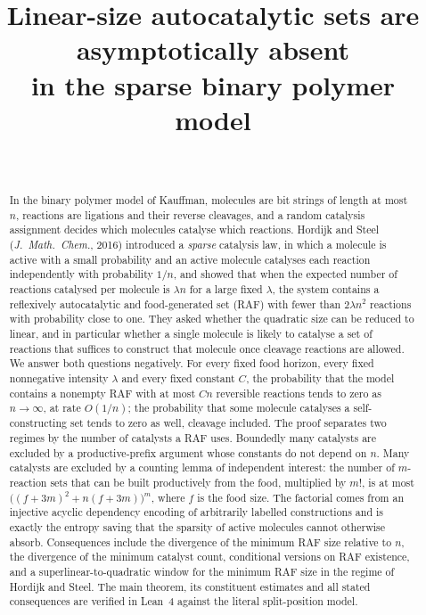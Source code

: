 \documentclass[11pt,a4paper]{article}
\title{Linear-size autocatalytic sets are asymptotically absent\\ in the sparse binary polymer model}
\author{\PaperAuthor\\ \PaperAffiliation}
\date{\PaperDate}
\theoremstyle{plain}
\theoremstyle{definition}
\theoremstyle{remark}
\begin{document}
\maketitle

\begin{abstract}
In the binary polymer model of Kauffman, molecules are bit strings of length at most $n$, reactions are ligations and their reverse cleavages, and a random catalysis assignment decides which molecules catalyse which reactions. Hordijk and Steel (\emph{J.\ Math.\ Chem.}, 2016) introduced a \emph{sparse} catalysis law, in which a molecule is active with a small probability and an active molecule catalyses each reaction independently with probability $1/n$, and showed that when the expected number of reactions catalysed per molecule is $\lambda n$ for a large fixed $\lambda$, the system contains a reflexively autocatalytic and food-generated set (RAF) with fewer than $2\lambda n^2$ reactions with probability close to one. They asked whether the quadratic size can be reduced to linear, and in particular whether a single molecule is likely to catalyse a set of reactions that suffices to construct that molecule once cleavage reactions are allowed. We answer both questions negatively. For every fixed food horizon, every fixed nonnegative intensity $\lambda$ and every fixed constant $C$, the probability that the model contains a nonempty RAF with at most $Cn$ reversible reactions tends to zero as $n\to\infty$, at rate $O(1/n)$; the probability that some molecule catalyses a self-constructing set tends to zero as well, cleavage included. The proof separates two regimes by the number of catalysts a RAF uses. Boundedly many catalysts are excluded by a productive-prefix argument whose constants do not depend on $n$. Many catalysts are excluded by a counting lemma of independent interest: the number of $m$-reaction sets that can be built productively from the food, multiplied by $m!$, is at most $\big((f+3m)^2+n(f+3m)\big)^m$, where $f$ is the food size. The factorial comes from an injective acyclic dependency encoding of arbitrarily labelled constructions and is exactly the entropy saving that the sparsity of active molecules cannot otherwise absorb. Consequences include the divergence of the minimum RAF size relative to $n$, the divergence of the minimum catalyst count, conditional versions on RAF existence, and a superlinear-to-quadratic window for the minimum RAF size in the regime of Hordijk and Steel. The main theorem, its constituent estimates and all stated consequences are verified in Lean~4 against the literal split-position model.
\end{abstract}
\end{document}
